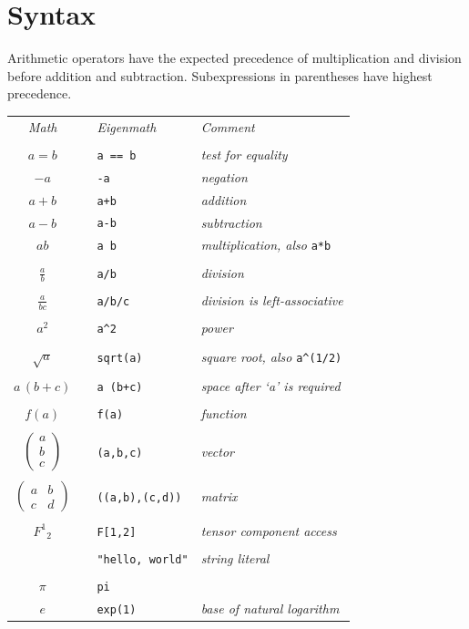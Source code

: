 
\newpage

\section{Syntax}

Arithmetic operators have the expected precedence of
multiplication and division before addition and subtraction.
Subexpressions in parentheses have highest precedence.

\begin{center}
\begin{tabular}{clll}
{\it Math} & & {\it Eigenmath} & {\it Comment}
\\
\\
$a=b$ & & \verb$a == b$ & {\it test for equality}
\\[1ex]
$-a$ & & \verb$-a$ & {\it negation}
\\[1ex]
$a+b$ & & \verb$a+b$ & {\it addition}
\\[1ex]
$a-b$ & & \verb$a-b$ & {\it subtraction}
\\[1ex]
$ab$ & & \verb$a b$ & {\it multiplication, also} \verb$a*b$
\\
\\
$\displaystyle\frac{a}{b}$ & & \verb$a/b$ & {\it division}
\\
\\
$\displaystyle\frac{a}{bc}$ & & \verb$a/b/c$ & {\it division is left-associative}
\\
\\
$a^2$ & & \verb$a^2$ & {\it power}
\\
\\
$\sqrt{a}$ & & \verb$sqrt(a)$ & {\it square root, also} \verb$a^(1/2)$
\\
\\
$a\,(b+c)$ & & \verb$a (b+c)$ & {\it space after `a' is required}
\\
\\
$f(a)$ & & \verb$f(a)$ & {\it function}
\\
\\
$\begin{pmatrix}a\\ b\\ c\end{pmatrix}$ & & \verb$(a,b,c)$ & {\it vector}
\\
\\
$\begin{pmatrix}a&b\\ c&d\end{pmatrix}$ & & \verb$((a,b),(c,d))$ & {\it matrix}
\\
\\
$F^1{}_2$ & & \verb$F[1,2]$ & {\it tensor component access}
\\
\\
 & & \verb$"hello, world"$ & {\it string literal}
\\
\\
$\pi$ & & \verb$pi$ &
\\[1ex]
$e$ && \verb$exp(1)$ & {\it base of natural logarithm}
\end{tabular}
\end{center}


